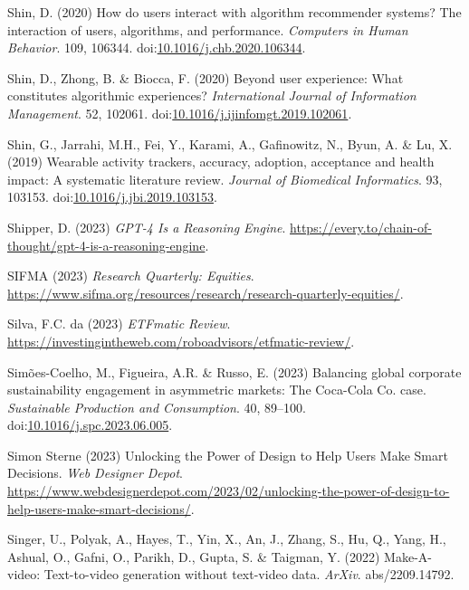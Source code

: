 \documentclass[
  letterpaper,
  DIV=11,
  numbers=noendperiod]{scrartcl}
\newlength{\cslhangindent}
\newenvironment{CSLReferences}[2] %
 {\begin{list}{}{%
  \setlength{\itemindent}{0pt}
  \setlength{\leftmargin}{0pt}
  \setlength{\parsep}{0pt}
  \ifodd #1
   \setlength{\leftmargin}{\cslhangindent}
   \setlength{\itemindent}{-1\cslhangindent}
  \fi
  \setlength{\itemsep}{#2\baselineskip}}}
 {\end{list}}
\begin{document}
\begin{CSLReferences}{0}{1}
Shin, D. (2020) How do users interact with algorithm recommender
systems? {The} interaction of users, algorithms, and performance.
\emph{Computers in Human Behavior}. 109, 106344.
doi:\href{https://doi.org/10.1016/j.chb.2020.106344}{10.1016/j.chb.2020.106344}.

Shin, D., Zhong, B. \& Biocca, F. (2020) Beyond user experience: {What}
constitutes algorithmic experiences? \emph{International Journal of
Information Management}. 52, 102061.
doi:\href{https://doi.org/10.1016/j.ijinfomgt.2019.102061}{10.1016/j.ijinfomgt.2019.102061}.

Shin, G., Jarrahi, M.H., Fei, Y., Karami, A., Gafinowitz, N., Byun, A.
\& Lu, X. (2019) Wearable activity trackers, accuracy, adoption,
acceptance and health impact: {A} systematic literature review.
\emph{Journal of Biomedical Informatics}. 93, 103153.
doi:\href{https://doi.org/10.1016/j.jbi.2019.103153}{10.1016/j.jbi.2019.103153}.

Shipper, D. (2023) \emph{{GPT-4 Is} a {Reasoning Engine}}.
\url{https://every.to/chain-of-thought/gpt-4-is-a-reasoning-engine}.

SIFMA (2023) \emph{Research {Quarterly}: {Equities}}.
\url{https://www.sifma.org/resources/research/research-quarterly-equities/}.

Silva, F.C. da (2023) \emph{{ETFmatic Review}}.
\url{https://investingintheweb.com/roboadvisors/etfmatic-review/}.

Simões-Coelho, M., Figueira, A.R. \& Russo, E. (2023) Balancing global
corporate sustainability engagement in asymmetric markets: {The
Coca-Cola Co}. case. \emph{Sustainable Production and Consumption}. 40,
89--100.
doi:\href{https://doi.org/10.1016/j.spc.2023.06.005}{10.1016/j.spc.2023.06.005}.

Simon Sterne (2023) Unlocking the {Power} of {Design} to {Help Users
Make Smart Decisions}. \emph{Web Designer Depot}.
\url{https://www.webdesignerdepot.com/2023/02/unlocking-the-power-of-design-to-help-users-make-smart-decisions/}.

Singer, U., Polyak, A., Hayes, T., Yin, X., An, J., Zhang, S., Hu, Q.,
Yang, H., Ashual, O., Gafni, O., Parikh, D., Gupta, S. \& Taigman, Y.
(2022) Make-{A-video}: {Text-to-video} generation without text-video
data. \emph{ArXiv}. abs/2209.14792.


\end{CSLReferences}
\end{document}
